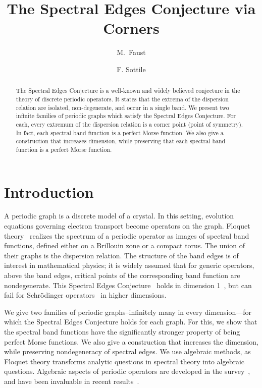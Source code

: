 \documentclass[12pt]{amsart}
\title{The Spectral Edges Conjecture via Corners}
\author{M.~Faust}
\author{F. Sottile}
\theoremstyle{remark}
\begin{document}
\begin{abstract}
 The Spectral Edges Conjecture is a well-known and widely believed conjecture in the theory of discrete periodic
 operators.
 It states that the extrema of the dispersion relation are isolated, non-degenerate, and occur in a single band.
 We present two infinite families of periodic graphs which satisfy the Spectral Edges Conjecture.
 For each, every extremum of the dispersion relation is a corner point (point of symmetry).
 In fact, each spectral band function is a perfect Morse function.
 We also give a construction that increases dimension, while preserving that each spectral band function is a perfect Morse
 function.
\end{abstract}
\maketitle 

\section*{Introduction}

A periodic graph is a discrete model of a crystal.
In this setting, evolution equations governing electron transport become operators on the graph.
Floquet theory~\cite{KuchBook} realizes the spectrum of a periodic operator as images of spectral
band functions, defined either on a Brillouin zone or a compact torus.
The union of their graphs is the dispersion relation.
The structure of the band edges is of interest in mathematical physics; it is widely assumed that for generic operators, above
the band edges, critical points of the corresponding band function are nondegenerate.
This Spectral Edges Conjecture~\cite[Conj.\ 5.25]{KuchBAMS} holds in dimension 1~\cite[\S XIII.16]{RS78},
but can fail for Schr\"odinger operators~\cite{fk18} in higher dimensions.

We give two families of periodic graphs--infinitely many in every dimension---for which the
Spectral Edges Conjecture holds for each graph.
For this, we show that the spectral band functions have the significantly stronger property of being
perfect Morse functions.
We also give a construction that increases the dimension, while preserving nondegeneracy of spectral edges.
We use algebraic methods, as Floquet theory transforms analytic questions in spectral theory into algebraic questions.
Algebraic aspects of periodic operators are developed in the survey~\cite{AAPGO}, and have been invaluable in
recent  results~\cite{FL-G,FLM22,GKT,Liu22}.
\end{document}
